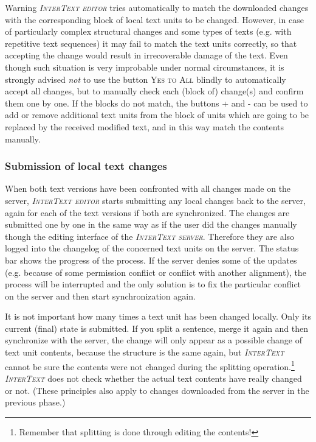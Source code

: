 \documentclass[a4paper,10pt,oneside]{book}
\newcommand{\IT}{\textit{\textsc{InterText}}\xspace}
\newcommand{\ITeditor}{\textit{\textsc{InterText editor}}\xspace}
\newcommand{\ITserver}{\textit{\textsc{InterText server}}\xspace}
\newcommand{\menu}[1]{\textsc{#1}}
\begin{document}
\medskip
\begin{bclogo}[couleur = blue!30, arrondi = 0.1, logo = \bcattention,
ombre = true , epOmbre = 0.125, couleurOmbre = black!30, blur, epBord = 0.3, marge = 5]{Warning}\small
\ITeditor tries automatically to match the downloaded changes with the corresponding block of local text units to be changed. However, in case of particularly complex structural changes and some types of texts (e.g. with repetitive text sequences) it may fail to match the text units correctly, so that accepting the change would result in irrecoverable damage of the text. Even though such situation is very improbable under normal circumstances, it is strongly advised \emph{not} to use the button \menu{Yes to All} blindly to automatically accept all changes, but to manually check each (block of) change(s) and confirm them one by one. If the blocks do not match, the buttons \menu{+} and \menu{-} can be used to add or remove additional text units from the block of units which are going to be replaced by the received modified text, and in this way match the contents manually.
\end{bclogo}

\subsubsection{Submission of local text changes}\label{ch:detail:managing_remote:sync:upload}

When both text versions have been confronted with all changes made on the server, \ITeditor starts submitting any local changes back to the server, again for each of the text versions if both are synchronized. The changes are submitted one by one in the same way as if the user did the changes manually though the editing interface of the \ITserver. Therefore they are also logged into the changelog of the concerned text units on the server. The status bar shows the progress of the process. If the server denies some of the updates (e.g. because of some permission conflict or conflict with another alignment), the process will be interrupted and the only solution is to fix the particular conflict on the server and then start synchronization again.

It is not important how many times a text unit has been changed locally. Only its current (final) state is submitted. If you split a sentence, merge it again and then synchronize with the server, the change will only appear as a possible change of text unit contents, because the structure is the same again, but \IT cannot be sure the contents were not changed during the splitting operation.\footnote{Remember that splitting is done through editing the contents!} \IT does not check whether the actual text contents have really changed or not. (These principles also apply to changes downloaded from the server in the previous phase.)
\end{document}
